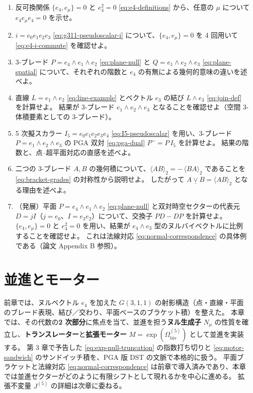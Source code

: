 \documentclass[dvipdfmx,a4paper,oneside]{jsbook}
\numberwithin{equation}{chapter}
\begin{document}
\begin{enumerate}[leftmargin=2em]
  \item 反可換関係 \(\{e_4, e_\mu\} = 0\) と \(e_4^2 = 0\) \eqref{eq:e4-definitions} から、任意の \(\mu\) について \(e_4 e_\mu e_4 = 0\) を示せ。

  \item \(i = e_0 e_1 e_2 e_3\) \eqref{eq:g311-pseudoscalar-i} について、\(\{e_4, e_\mu\} = 0\) を 4 回用いて \eqref{eq:e4-i-commute} を確認せよ。

  \item 3-ブレード \(P = e_4 \wedge e_1 \wedge e_2\) \eqref{eq:plane-null} と \(Q = e_1 \wedge e_2 \wedge e_3\) \eqref{eq:plane-spatial} について、それぞれの階数と \(e_4\) の有無による幾何的意味の違いを述べよ。

  \item 直線 \(L = e_1 \wedge e_2\) \eqref{eq:line-example} とベクトル \(e_3\) の結び \(L \wedge e_3\) \eqref{eq:join-def} を計算せよ。
  結果が 3-ブレード \(e_1 \wedge e_2 \wedge e_3\) となることを確認せよ（空間 3-体積要素としての 3-ブレード）。

  \item 5 次擬スカラー \(I_5 = e_0 e_1 e_2 e_3 e_4\) \eqref{eq:I5-pseudoscalar} を用い、3-ブレード \(P = e_1 \wedge e_2 \wedge e_3\) の PGA 双対 \eqref{eq:pga-dual} \(P^{\sim} = P\, I_5\) を計算せよ。
  結果の階数と、点–超平面対応の直感を述べよ。

  \item 二つの 3-ブレード \(A, B\) の幾何積について、\(\langle AB \rangle_2 = -\,\langle BA \rangle_2\) であることを \eqref{eq:bracket-grades} の対称性から説明せよ。
  したがって \(A \mathbin{\underline{\vee}} B = \langle AB \rangle_2\) となる理由を述べよ。

  \item （発展）平面 \(P = e_4 \wedge e_1 \wedge e_2\) \eqref{eq:plane-null} と双対時空セクターの代表元 \(D = jI\)（\(j = e_0\)、\(I = e_3 e_2\)）について、交換子 \(PD - DP\) を計算せよ。
  \(\{e_4, e_\mu\} = 0\) と \(e_4^2 = 0\) を用い、結果が \(e_4 \wedge e_3\) 型のヌルバイベクトルに比例することを確認せよ。
  これは法線対応 \eqref{eq:normal-correspondence} の具体例である（論文 Appendix B 参照）。
\end{enumerate}

\chapter{並進とモーター}

前章では、ヌルベクトル \(e_4\) を加えた \(G(3,1,1)\) の射影構造（点・直線・平面のブレード表現、結び／交わり、平面ベースのブラケット積）を整えた。
本章では、その代数の\textbf{2 次部分}に焦点を当て、並進を担う\textbf{ヌル生成子} \(N_\mu\) の性質を確立し、\textbf{トランスレーター}と\textbf{拡張モーター} \(M = \exp(\Omega_{\mathrm{biv}}^{(5)})\) として並進を実装する。
第 3 章で予告した \eqref{eq:exp-null-truncation} の指数打ち切りと \eqref{eq:motor-sandwich} のサンドイッチ積を、PGA 版 DST の文脈で本格的に扱う。
平面ブラケットと法線対応 \eqref{eq:normal-correspondence} は前章で導入済みであり、本章では並進セクターがどのように有限シフトとして現れるかを中心に進める。
拡張不変量 \(J^{(5)}\) の詳細は次章に委ねる。
\end{document}
